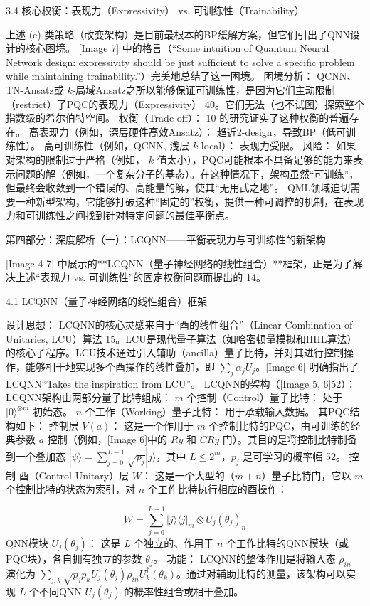 \documentclass[12pt,a4paper]{article}
\begin{document}
3.4 核心权衡：表现力（Expressivity） vs. 可训练性（Trainability）

上述 (c) 类策略（改变架构）是目前最根本的BP缓解方案，但它们引出了QNN设计的核心困境。
[Image 7] 中的格言（“Some intuition of Quantum Neural Network design: expressivity should be just sufficient to solve a specific problem while maintaining trainability.”）完美地总结了这一困境。
困境分析： QCNN、TN-Ansatz或 $k$-局域Ansatz之所以能够保证可训练性，是因为它们主动限制（restrict）了PQC的表现力（Expressivity） 40。它们无法（也不试图）探索整个指数级的希尔伯特空间。
权衡（Trade-off）： 10 的研究证实了这种权衡的普遍存在。
高表现力（例如，深层硬件高效Ansatz）： 趋近2-design，导致BP（低可训练性）。
高可训练性（例如，QCNN, 浅层 $k$-local）： 表现力受限。
风险： 如果对架构的限制过于严格（例如， $k$ 值太小），PQC可能根本不具备足够的能力来表示问题的解（例如，一个复杂分子的基态）。在这种情况下，架构虽然“可训练”，但最终会收敛到一个错误的、高能量的解，使其“无用武之地”。
QML领域迫切需要一种新型架构，它能够打破这种“固定的”权衡，提供一种可调控的机制，在表现力和可训练性之间找到针对特定问题的最佳平衡点。

第四部分：深度解析（一）：LCQNN——平衡表现力与可训练性的新架构

[Image 4-7] 中展示的**LCQNN（量子神经网络的线性组合）**框架，正是为了解决上述“表现力 vs. 可训练性”的固定权衡问题而提出的 14。

4.1 LCQNN（量子神经网络的线性组合）框架

设计思想：
LCQNN的核心灵感来自于“酉的线性组合”（Linear Combination of Unitaries, LCU）算法 15。LCU是现代量子算法（如哈密顿量模拟和HHL算法）的核心子程序。LCU技术通过引入辅助（ancilla）量子比特，并对其进行控制操作，能够相干地实现多个酉操作的线性叠加，即 $\sum_j \alpha_j U_j$。[Image 6] 明确指出了LCQNN“Takes the inspiration from LCU”。
LCQNN的架构（[Image 5, 6]52）：
LCQNN架构由两部分量子比特组成：
$m$ 个控制（Control）量子比特： 处于 $|0\rangle^{\otimes m}$ 初始态。
$n$ 个工作（Working）量子比特： 用于承载输入数据。
其PQC结构如下：
控制层 $V(a)$： 这是一个作用于 $m$ 个控制比特的PQC，由可训练的经典参数 $a$ 控制（例如，[Image 6]中的 $Ry$ 和 $CRy$ 门）。其目的是将控制比特制备到一个叠加态 $|\psi\rangle = \sum_{j=0}^{L-1} \sqrt{p_j} |j\rangle$，其中 $L \le 2^m$，$p_j$ 是可学习的概率幅 52。
控制-酉（Control-Unitary）层 $W$： 这是一个大型的（$m+n$）量子比特门，它以 $m$ 个控制比特的状态为索引，对 $n$ 个工作比特执行相应的酉操作：

$$W = \sum_{j=0}^{L-1} |j\rangle\langle j|_m \otimes U_j(\theta_j)_n$$
QNN模块 $U_j(\theta_j)$： 这是 $L$ 个独立的、作用于 $n$ 个工作比特的QNN模块（或PQC块），各自拥有独立的参数 $\theta_j$。
功能：
LCQNN的整体作用是将输入态 $\rho_{in}$ 演化为 $\sum_{j,k} \sqrt{p_j p_k} U_j(\theta_j) \rho_{in} U_k^\dagger(\theta_k)$。通过对辅助比特的测量，该架构可以实现 $L$ 个不同QNN $U_j(\theta_j)$ 的概率性组合或相干叠加。
\end{document}
